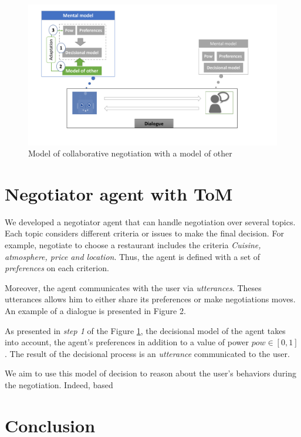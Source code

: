 \documentclass[sigconf]{aamas}  %
\begin{document}
	\begin{figure}
		\includegraphics[width=0.65\linewidth, height= 0.25\textheight]{figs/model_tom.pdf}
		\caption{Model of collaborative negotiation with a model of other} 
		\label{fig:schema-general}
	\end{figure} 


	\section{Negotiator agent with ToM}
		We developed a negotiator agent that can handle negotiation over several topics. Each topic considers different criteria or issues to make the final decision. For example, negotiate to choose a restaurant includes the criteria \textit{Cuisine, atmosphere, price and location}. 
		 Thus, the agent is defined with a set of \textit{preferences} on each criterion. 
		
		Moreover, the agent communicates with the user via \emph{utterances}. Theses utterances allows him to either share its preferences or make negotiations moves. An example of a dialogue is presented in Figure 2. 
		
		
		As presented in \textit{step 1} of the Figure \ref{fig:schema-general}, the decisional model of the agent takes into account, the agent's preferences in addition to a value of power $pow \in  [0,1]$. The result of the decisional process is an \emph{utterance} communicated to the user. 
		
		We aim to use this model of decision to reason about the user's behaviors during the negotiation. Indeed, based
		
	\section{Conclusion}

	
	
	
\end{document}
